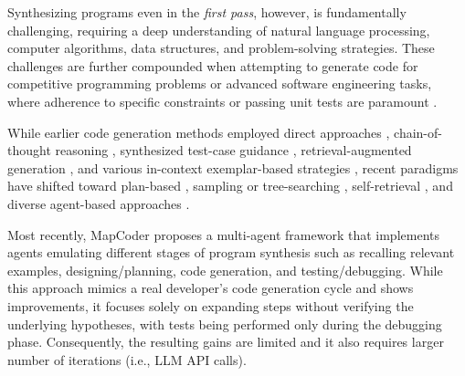 Synthesizing programs even in the \emph{first pass}, however, is fundamentally challenging, requiring a deep understanding of natural language processing, computer algorithms, data structures, and problem-solving strategies. These challenges are further compounded when attempting to generate code for competitive programming problems or advanced software engineering tasks, where adherence to specific constraints or passing unit tests are paramount \cite{khan2023xcodeeval}. 


While earlier code generation methods employed direct approaches \cite{chen2021codex}, chain-of-thought reasoning \citep{CoT}, synthesized test-case guidance \cite{codet}, retrieval-augmented generation \cite{parvez2021retrieval}, and various in-context exemplar-based strategies \citep{shum-etal-2023-automatic, zhang2022automatic}, recent paradigms have shifted toward plan-based \cite{jiang2023self}, sampling or tree-searching \cite{zhou2023lats}, self-retrieval \cite{yasunaga2023large}, and diverse agent-based approaches \cite {zhang-etal-2024-codeagent, qian-etal-2024-chatdev, shinn2023reflexion, huang2023agentcoder, dong2023selfcollaboration}.


Most recently, MapCoder \cite{islam-etal-2024-mapcoder} proposes a multi-agent framework that implements agents emulating different stages of program synthesis such as recalling relevant examples, designing/planning, code generation, and testing/debugging. While this approach mimics a real developer's code generation cycle and shows improvements, it focuses solely on expanding steps without verifying the underlying hypotheses, with tests being performed only during the debugging phase. Consequently, the resulting gains are limited and it also requires larger number of iterations (i.e., LLM API calls).

